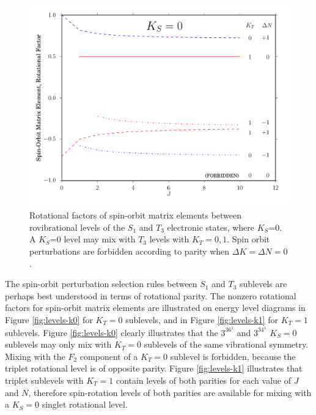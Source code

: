 \documentclass[12pt]{mitthesis}
\begin{document}
\begin{figure}
  \caption{Rotational factors of spin-orbit matrix elements between
    rovibrational levels of the $S_1$ and $T_3$ electronic states,
    where $K_S$=0.  A $K_S$=0 level may mix with $T_3$ levels with
    $K_T=0,1$.  Spin orbit perturbations are forbidden according to
    parity when $\Delta K = \Delta N = 0$.}
  \label{fig:rotational-factors}
  \centering
  \includegraphics[width=6in]{rotational-factors-k0.pdf}
\end{figure}


The spin-orbit perturbation selection rules between $S_1$ and $T_3$
sublevels are perhaps best understood in terms of rotational parity.
The nonzero rotational factors for spin-orbit matrix elements are
illustrated on energy level diagrams in Figure \ref{fig:levels-k0} for
$K_T=0$ sublevels, and in Figure \ref{fig:levels-k1} for $K_T=1$
sublevels.  Figure \ref{fig:levels-k0} clearly illustrates that the
$3^36^1$ and $3^34^1$ $K_S=0$ sublevels may only mix with $K_T=0$
sublevels of the same vibrational symmetry.  Mixing with the $F_2$
component of a $K_T=0$ sublevel is forbidden, because the triplet
rotational level is of opposite parity.  Figure \ref{fig:levels-k1}
illustrates that triplet sublevels with $K_T=1$ contain levels of both
parities for each value of $J$ and $N$, therefore spin-rotation levels
of both parities are available for mixing with a $K_S=0$ singlet
rotational level.
\end{document}
